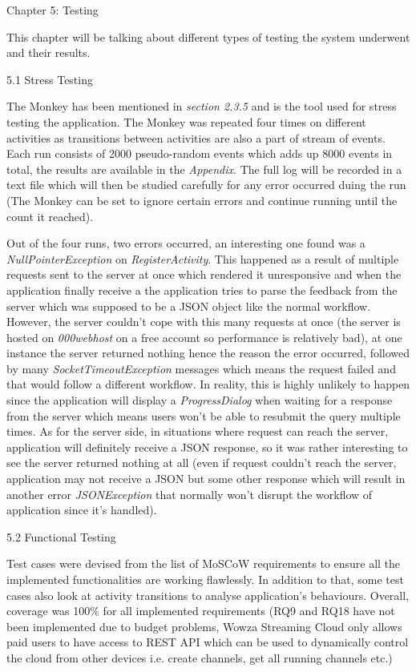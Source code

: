 \documentclass{article}
\begin{document}
\begin{flushleft}
\newpage
{\huge Chapter 5: Testing}\par
This chapter will be talking about different types of testing the system underwent and their results.\par
{\Large 5.1 Stress Testing}\par
The Monkey has been mentioned in \textit{section 2.3.5} and is the tool used for stress testing the application. The Monkey was repeated four times on different activities as transitions between activities are also a part of stream of events. Each run consists of 2000 pseudo-random events which adds up 8000 events in total, the results are available in the \textit{Appendix}. The full log will be recorded in a text file which will then be studied carefully for any error occurred duing the run (The Monkey can be set to ignore certain errors and continue running until the count it reached).\par
Out of the four runs, two errors occurred, an interesting one found was a \textit{NullPointerException} on \textit{RegisterActivity}. This happened as a result of multiple requests sent to the server at once which rendered it unresponsive and when the application finally receive a  the application tries to parse the feedback from the server which was supposed to be a JSON object like the normal workflow. However, the server couldn't cope with this many requests at once (the server is hosted on \textit{000webhost} on a free account so performance is relatively bad), at one instance the server returned nothing hence the reason the error occurred, followed by many \textit{SocketTimeoutException} messages which means the request failed and that would follow a different workflow. In reality, this is highly unlikely to happen since the application will display a \textit{ProgressDialog} when waiting for a response from the server which means users won't be able to resubmit the query multiple times. As for the server side, in situations where request can reach the server, application will definitely receive a JSON response, so it was rather interesting to see the server returned nothing at all (even if request couldn't reach the server, application may not receive a JSON but some other response which will result in another error \textit{JSONException} that normally won't disrupt the workflow of application since it's handled).\par
{\Large 5.2 Functional Testing}\par
Test cases were devised from the list of MoSCoW requirements to ensure all the implemented functionalities are working flawlessly. In addition to that, some test cases also look at activity transitions to analyse application's behaviours. Overall, coverage was 100\% for all implemented requirements (RQ9 and RQ18 have not been implemented due to budget problems, Wowza Streaming Cloud only allows paid users to have access to REST API which can be used to dynamically control the cloud from other devices i.e. create channels, get all running channels etc.)\par

\end{flushleft}
\end{document}
